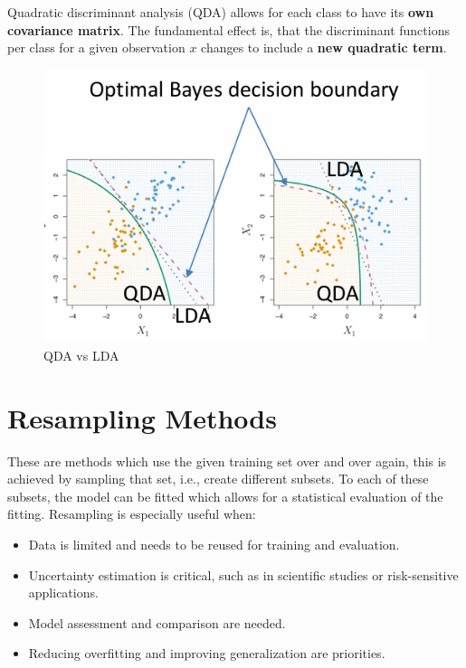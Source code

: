 \documentclass[../Main.tex]{subfiles}
\begin{document}
Quadratic discriminant analysis (QDA) 
allows for each class to have its \textbf{own
covariance matrix}.
The fundamental effect is, that the 
discriminant functions per class for a 
given observation \(x\) changes to 
include a \textbf{new quadratic term}.

\begin{figure}[H]
    \centering
    \includegraphics[width=0.75\linewidth]{Images/qda-vs-lda.png}
    \caption{QDA vs LDA}
\end{figure}

\newpage

\section{Resampling Methods}
These are methods which use the given training 
set over and over again, this is achieved by sampling that set, i.e., 
create different subsets. To each of these subsets, the model 
can be fitted which allows for a statistical evaluation of the fitting.
Resampling is especially useful when:
\begin{itemize}
    \item Data is limited and needs to be reused for training and evaluation.
    \item Uncertainty estimation is critical, such as in scientific studies or risk-sensitive applications.
    \item Model assessment and comparison are needed.
    \item Reducing overfitting and improving generalization are priorities.
\end{itemize}
\end{document}
